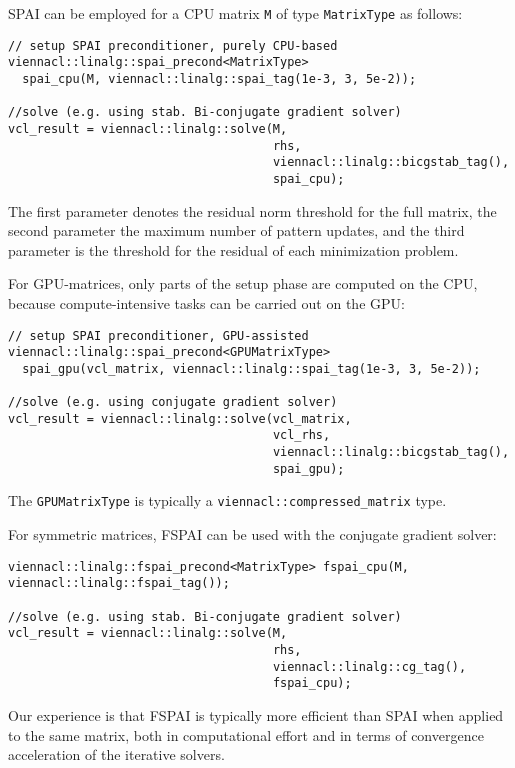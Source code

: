 SPAI can be employed for a CPU matrix \lstinline|M| of type \lstinline|MatrixType| as follows:
\begin{lstlisting}
// setup SPAI preconditioner, purely CPU-based
viennacl::linalg::spai_precond<MatrixType> 
  spai_cpu(M, viennacl::linalg::spai_tag(1e-3, 3, 5e-2));

//solve (e.g. using stab. Bi-conjugate gradient solver)
vcl_result = viennacl::linalg::solve(M,
                                     rhs,
                                     viennacl::linalg::bicgstab_tag(),
                                     spai_cpu);
\end{lstlisting}
The first parameter denotes the residual norm threshold for the full matrix, the second parameter the maximum number of pattern updates, and the third
parameter is the threshold for the residual of each minimization problem.

For GPU-matrices, only parts of the setup phase are computed on the CPU, because compute-intensive tasks can be carried out on the GPU:
\begin{lstlisting}
// setup SPAI preconditioner, GPU-assisted
viennacl::linalg::spai_precond<GPUMatrixType> 
  spai_gpu(vcl_matrix, viennacl::linalg::spai_tag(1e-3, 3, 5e-2));

//solve (e.g. using conjugate gradient solver)
vcl_result = viennacl::linalg::solve(vcl_matrix,
                                     vcl_rhs,
                                     viennacl::linalg::bicgstab_tag(),
                                     spai_gpu);
\end{lstlisting}
The \lstinline|GPUMatrixType| is typically a \lstinline|viennacl::compressed_matrix| type.

For symmetric matrices, FSPAI can be used with the conjugate gradient solver:
\begin{lstlisting}
viennacl::linalg::fspai_precond<MatrixType> fspai_cpu(M, viennacl::linalg::fspai_tag());

//solve (e.g. using stab. Bi-conjugate gradient solver)
vcl_result = viennacl::linalg::solve(M,
                                     rhs,
                                     viennacl::linalg::cg_tag(),
                                     fspai_cpu);
\end{lstlisting}
Our experience is that FSPAI is typically more efficient than SPAI when applied to the same matrix, both in computational effort and in terms of convergence
acceleration of the iterative solvers. 


